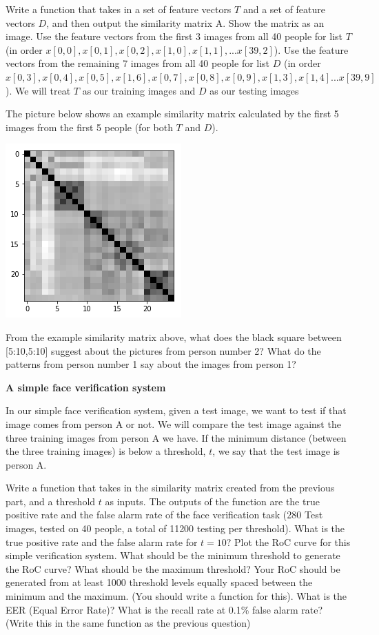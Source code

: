 \documentclass{article}
\newcounter{question}
\begin{document}
\question Write a function that takes in a set of feature vectors $T$ and a set of feature vectors $D$, and then output the similarity matrix A. Show the matrix as an image. Use the feature vectors from the first 3 images from all 40 people for list $T$ (in order $x[0,0], x[0,1], x[0,2], x[1,0], x[1,1],...x[39,2]$). Use the feature vectors from the remaining 7 images from all 40 people for list $D$ (in order $x[0,3], x[0,4], x[0,5], x[1,6], x[0,7],x[0,8],x[0,9],x[1,3],x[1,4]...x[39,9]$). We will treat $T$ as our training images and $D$ as our testing images

The picture below shows an example similarity matrix calculated by the first 5 images from the first 5 people (for both $T$ and $D$).


\includegraphics[scale=0.5]{similarity.png}

\question From the example similarity matrix above, what does the black square between [5:10,5:10] suggest about the pictures from person number 2? What do the patterns from person number 1 say about the images from person 1?

\textbf{A simple face verification system}

In our simple face verification system, given a test image, we want to test if that image comes from person A or not. We will compare the test image against the three training images from person A we have. If the minimum distance (between the three training images) is below a threshold, $t$, we say that the test image is person A.

\question Write a function that takes in the similarity matrix created from the previous part, and a threshold $t$ as inputs. The outputs of the function are the true positive rate and the false alarm rate of the face verification task (280 Test images, tested on 40 people, a total of 11200 testing per threshold). What is the true positive rate and the false alarm rate for $t=10$?
\question Plot the RoC curve for this simple verification system. What should be the minimum threshold to generate the RoC curve? What should be the maximum threshold? Your RoC should be generated from at least 1000 threshold levels equally spaced between the minimum and the maximum. (You should write a function for this).
\question What is the EER (Equal Error Rate)? What is the recall rate at 0.1\% false alarm rate? (Write this in the same function as the previous question)
\end{document}
